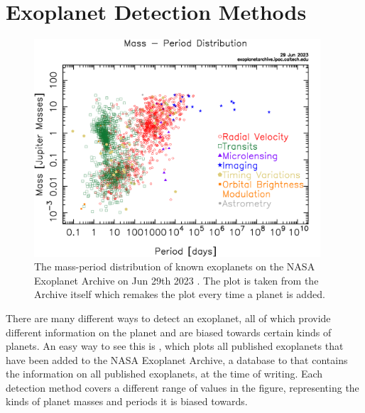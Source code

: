 
\section{Exoplanet Detection Methods}
\label{sec:detection_methods}

\begin{figure}
  \begin{center}
    \includegraphics[width=0.95\textwidth]{intro/exo_massperiod.png}
  \end{center}
  \caption{The mass-period distribution of known exoplanets on the 
  NASA Exoplanet Archive on Jun 29th 2023
  \citep{akesonNASAExoplanet2013}. The plot is taken from the Archive
  itself which remakes the plot every time a planet is added.}
  \label{fig:archive_exoplanet_distribution}
\end{figure}

There are many different ways to detect an exoplanet, all of which provide
different information on the planet and are biased towards certain kinds of
planets. An easy way to see this is
, which plots all published exoplanets
that have been added to the NASA Exoplanet Archive, a database to that contains
the information on all published exoplanets, at the time of writing. Each detection
method covers a different range of values in the figure, representing the kinds
of planet masses and periods it is biased towards.

